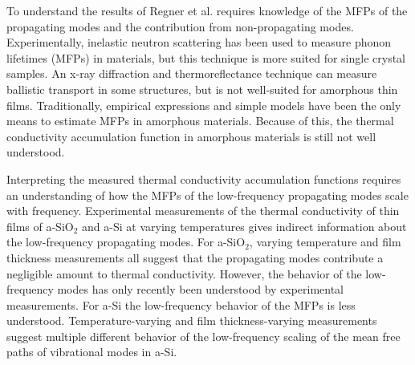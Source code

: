 \documentclass[aps,prb,twocolumn,superscriptaddress,footinbib,amsmath,amssymb,floatfix]{revtex4}
\begin{document}
To understand the results of Regner et al. requires knowledge of 
the MFPs of the 
propagating modes and the contribution from non-propagating modes. 
Experimentally, inelastic neutron scattering has been
used to measure phonon lifetimes (MFPs) in materials,
but this technique is more suited for single crystal samples.
\cite{christianson_phonon_2008} 
An x-ray diffraction and thermoreflectance technique
can measure ballistic transport in some structures, but is 
not well-suited for amorphous thin films.
\cite{highland_ballistic-phonon_2007} 
Traditionally, empirical expressions and
simple models have been the only means
to estimate MFPs in amorphous materials.
\cite{zeller_thermal_1971,graebner_phonon_1986,
freeman_thermal_1986,cahill_lattice_1988,cahill_heat_1989} 
Because of this, the thermal conductivity accumulation 
function in amorphous materials is still not well understood.
\cite{feldman_thermal_1993,cahill_thermal_1994,
feldman_numerical_1999,liu_high_2009,yang_anomalously_2010,
he_heat_2011,regner_broadband_2013}

Interpreting the measured thermal conductivity accumulation 
functions 
requires an understanding of how the MFPs of the 
low-frequency propagating modes scale with frequency.
\cite{freeman_thermal_1986,graebner_phonon_1986,
love_estimate_1990,feldman_thermal_1993,cahill_thermal_1994,
feldman_numerical_1999,baldi_thermal_2008,liu_high_2009,
yang_anomalously_2010} 
Experimental measurements of the thermal conductivity of
thin films of a-SiO$_2$ and a-Si at varying temperatures 
gives indirect information about the low-frequency propagating 
modes.\cite{freeman_thermal_1986,graebner_phonon_1986,
love_estimate_1990,feldman_thermal_1993,cahill_thermal_1994,
feldman_numerical_1999,zink_thermal_2006,baldi_thermal_2008,
liu_high_2009,yang_anomalously_2010,hondongwa_ultrasonic_2011} 
For a-SiO$_2$, varying temperature 
and film thickness
\cite{graebner_phonon_1986,freeman_thermal_1986,
cahill_lattice_1988,cahill_heat_1989,love_estimate_1990,
lee_heat_1997,yamane_measurement_2002,baldi_thermal_2008} 
measurements all suggest that the propagating modes 
contribute a negligible amount to thermal conductivity. 
However, the behavior of the low-frequency modes 
has only recently been understood by experimental 
measurements.
\cite{masciovecchio_evidence_2006,baldi_thermal_2008,
baldi_sound_2010,baldi_elastic_2011,baldi_emergence_2013} 
For a-Si the low-frequency behavior of the MFPs is less understood.
\cite{feldman_thermal_1993,cahill_thermal_1994,
feldman_numerical_1999,zink_thermal_2006,liu_high_2009,
yang_anomalously_2010,he_heat_2011,hondongwa_ultrasonic_2011} 
Temperature-varying\cite{zink_thermal_2006} 
and film thickness-varying measurements
\cite{pompe_thermal_1988,cahill_thermal_1989,hasselman_thermal_1989,
kuo_thermal_1992,feldman_thermal_1993,cahill_thermal_1994,
wada_thermal_1996,feldman_numerical_1999,
moon_thermal_2002,zink_thermal_2006,zink_excess_2006,liu_high_2009,
yang_anomalously_2010}
suggest multiple different behavior of the low-frequency 
scaling of the mean free paths of vibrational modes in a-Si. 
\end{document}
